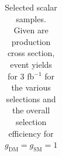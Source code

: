 \begin{table}[h!]
\begin{tabular}{lllllll}
\hline
\end{tabular}
\caption{Selected scalar samples. Given are production cross section, event yields for 3 fb$^{-1 }$ for the various selections and the overall selection efficiency for $g_\textrm{DM}=g_\textrm{SM}=1$}
\label{tab:dm_S_g1_3fb}
\end{table}



